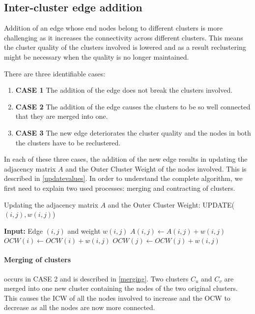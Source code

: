\subsection{Inter-cluster edge addition}

Addition of an edge whose end nodes belong to different clusters is more challenging as it increases the connectivity across different clusters. This means the cluster quality of the clusters involved is lowered and as a result reclustering might be necessary when the quality is no longer maintained. 

There are three identifiable cases:

\begin{enumerate}
	\item \textbf{CASE 1} The addition of the edge does not break the clusters involved.
	\item \textbf{CASE 2} The addition of the edge causes the clusters to be so well connected that they are merged into one.
	\item \textbf{CASE 3} The new edge deteriorates the cluster quality and the nodes in both the clusters have to be reclustered.
\end{enumerate}

In each of these three cases, the addition of the new edge results in updating the adjacency matrix $A$ and the Outer Cluster Weight of the nodes involved. This is described in \autoref{updatevalues}. In order to understand the complete algorithm, we first need to explain two used processes: merging and contracting of clusters.

\begin{algorithm}
\caption{Updating the adjacency matrix $A$ and the Outer Cluster Weight: UPDATE($(i,j),w(i,j)$)}
\label{updatevalues}
\begin{algorithmic}
\STATE \textbf{Input:} Edge $(i,j)$ and weight $w(i,j)$
\STATE $A(i,j) \leftarrow A(i,j) + w(i,j)$
\STATE $OCW(i) \leftarrow OCW(i) + w(i,j)$
\STATE $OCW(j) \leftarrow OCW(j) + w(i,j)$
\end{algorithmic}
\end{algorithm}

\paragraph{Merging of clusters} occurs in CASE 2 and is described in \autoref{merging}. Two clusters $C_u$ and $C_v$ are merged into one new cluster containing the nodes of the two original clusters. This causes the ICW of all the nodes involved to increase and the OCW to decrease as all the nodes are now more connected.

